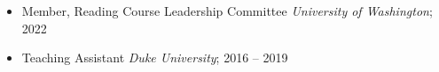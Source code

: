 \begin{itemize}
    \item Member, Reading Course Leadership Committee \hfill \textit{University of Washington}; 2022

    \item Teaching Assistant \hfill \textit{Duke University}; 2016 -- 2019

\end{itemize}
